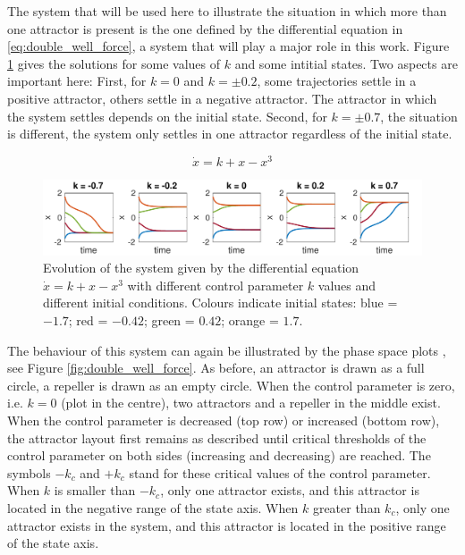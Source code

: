 The system that will be used here to illustrate the situation in which more than one attractor is present is the one defined by the differential equation in \ref{eq:double_well_force}, a system that will play a major role in this work. Figure \ref{fig:double_well_evolution} gives the solutions for some values of $k$ and some intitial states. Two aspects are important here: First, for $k = 0$ and $k = \pm0.2$, some trajectories settle in a positive attractor, others settle in a negative attractor. The attractor in which the system settles depends on the initial state. Second, for $k = \pm0.7$, the situation is different, the system only settles in one attractor regardless of the initial state.

\begin{equation}
\dot{x} = k + x - x^3
\label{eq:double_well_force}
\end{equation}

\begin{figure}
\includegraphics[width=\textwidth]{figures/ch3/evolution_of_double_well.pdf}
\caption[Evolution of the system given by the differential equation $\dot{x} = k + x - x^3$ with different control parameter $k$ values and different initial conditions.]{Evolution of the system given by the differential equation $\dot{x} = k + x - x^3$ with different control parameter $k$ values and different initial conditions. Colours indicate initial states: blue = $-1.7$; red = $-0.42$; green = $0.42$; orange = $1.7$.
}
\label{fig:double_well_evolution}
\end{figure}

The behaviour of this system can again be illustrated by the phase space plots \citep{Fuchs2013}, see Figure \ref{fig:double_well_force}. As before, an attractor is drawn as a full circle, a repeller is drawn as an empty circle. When the control parameter is zero, i.e. $k = 0$ (plot in the centre), two attractors and a repeller in the middle exist. When the control parameter is decreased (top row) or increased (bottom row), the attractor layout first remains as described until critical thresholds of the control parameter on both sides (increasing and decreasing) are reached. The symbols $-k_c$ and $+k_c$ stand for these critical values of the control parameter. When $k$ is smaller than $-k_c$, only one attractor exists, and this attractor is located in the negative range of the state axis. When $k$ greater than $k_c$, only one attractor exists in the system, and this attractor is located in the positive range of the state axis. 

